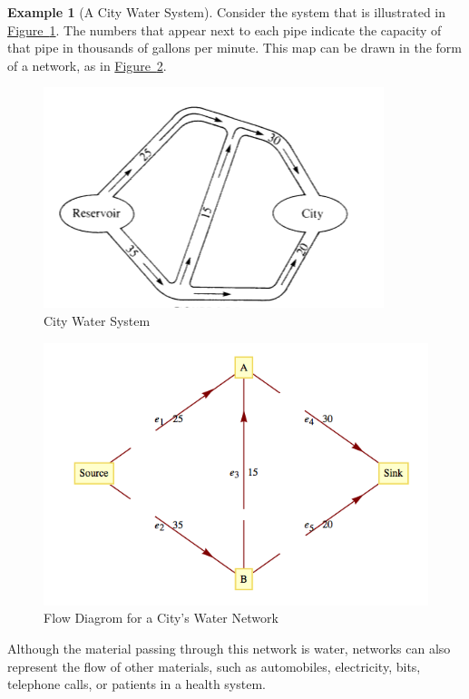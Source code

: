 \documentclass[10pt,]{book}
\theoremstyle{plain}
\theoremstyle{definition}
\theoremstyle{definition}
\theoremstyle{definition}
\newtheorem{example}[theorem]{Example}
\theoremstyle{definition}
\theoremstyle{definition}
\numberwithin{equation}{section}
\begin{document}
\begin{example}[A City Water System]\label{ex-city-water}
 Consider the system that is illustrated in \hyperref[fig-water-system]{Figure~\ref{fig-water-system}}. The numbers that appear next to each pipe indicate the capacity of
that pipe in thousands of gallons per minute. This map can be drawn in the form of a network, as in \hyperref[fig-water-network]{Figure~\ref{fig-water-network}}.
%
\leavevmode%
\begin{figure}
\centering
\includegraphics[width=1\linewidth]{images/fig-water-system.png}
\caption{City Water System
                \label{fig-water-system}}
\end{figure}
\leavevmode%
\begin{figure}
\centering
\includegraphics[width=1\linewidth]{images/fig-water-network.png}
\caption{Flow Diagrom for a City's Water Network
                \label{fig-water-network}}
\end{figure}
\par
Although the material passing through this network is water, networks can also represent the flow of other materials, such as automobiles, electricity, bits, telephone calls, or patients in a health system.%
\end{example}
\end{document}
